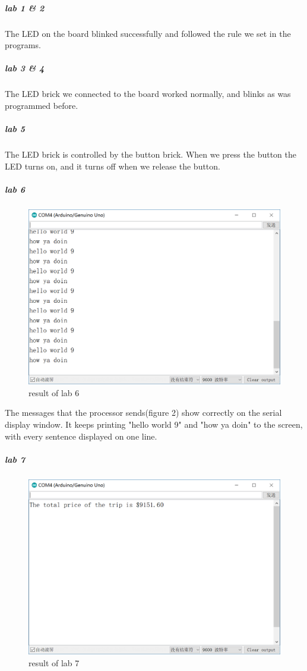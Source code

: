 \subparagraph{lab 1 \& 2}
The LED on the board blinked successfully and followed the rule we set in the programs.
\subparagraph{lab 3 \& 4}
The LED brick we connected to the board worked normally, and blinks as was programmed before.
\subparagraph{lab 5}
The LED brick is controlled by the button brick. When we press the button the LED turns on, and it turns off when we release the button.
\subparagraph{lab 6}
\begin{figure}
	\centering
	\label{fig:2}
	\includegraphics[width = \linewidth]{images/06_helloworld.PNG}
	\caption{result of lab 6}
\end{figure}
The messages that the processor sends(figure 2) show correctly on the serial display window. It keeps printing "hello world 9" and "how ya doin" to the screen, with every sentence displayed on one line.
\subparagraph{lab 7}
\begin{figure}
	\centering
	\label{fig:23}
	\includegraphics[width = \linewidth]{images/07_price.PNG}
	\caption{result of lab 7}
\end{figure}
